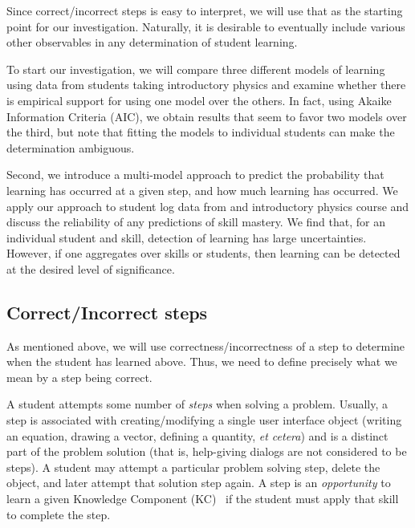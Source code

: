 \documentclass{acmlarge-edm}
\begin{document}
Since correct/incorrect steps is easy to interpret, we will use that
as the starting point for our investigation.  Naturally, it is
desirable to eventually include various other observables in any determination
of student learning.

To start our investigation, we will compare three different models of
learning using data from students taking introductory physics and examine
whether there is empirical support for using one model over the
others.  In fact, using Akaike Information Criteria (AIC), we obtain
results that seem to favor two models over the third, but note
that fitting the models to individual students can make the determination ambiguous.

Second, we introduce a multi-model approach to predict the probability that 
learning has occurred at a given step, and how much
learning has occurred.  We apply our approach to student log data from
and introductory physics course and discuss the reliability of any
predictions of skill mastery.  We find that, for an individual
student and skill, detection of learning has large uncertainties.
However, if one aggregates over skills or students, then learning can
be detected at the desired level of significance.


\subsection{Correct/Incorrect steps}

As mentioned above, we will use correctness/incorrectness of a step to
determine when the student has learned above.  Thus, we need to
define precisely what we mean by a step being correct.

A student attempts some number of {\em steps}  when solving a problem.  
Usually, a step is associated with creating/modifying a single user
interface object (writing an equation, drawing a vector,
defining a quantity, {\em et cetera}) and is a distinct part of the problem solution
(that is, help-giving dialogs are not considered to be steps).
A student may attempt a particular problem solving
step, delete the object, and later attempt that solution step again.
A step is an {\em opportunity} to learn
a given  Knowledge Component (KC)~\cite{vanlehn_behavior_2006} if the student 
must apply that skill to complete the step.

%
%
\end{document}
